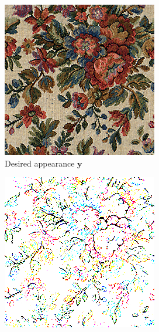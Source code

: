 \begin{figure}[]
\begin{subfigure}{\textwidth}
        \begin{subfigure}{0.24\textwidth}
            \centering
            \includegraphics[width=\textwidth]{images/04-experiment01/flowers/target.jpg}
            \caption*{Desired appearance \(\bm{y}\)}
        \end{subfigure}
        \hfill
        \begin{subfigure}{0.24\textwidth}
            \centering
            \includegraphics[width=\textwidth]{images/04-experiment01/flowers/threshold_bg.jpg}

\end{subfigure}
\end{subfigure}
\end{figure}
